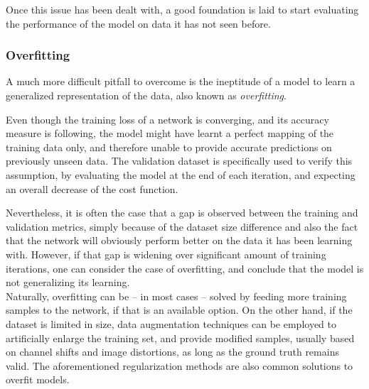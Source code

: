 Once this issue has been dealt with, a good foundation is laid to start
evaluating the performance of the model on data it has not seen before.

	\subsubsection{Overfitting}

A much more difficult pitfall to overcome is the ineptitude of a model to learn
a generalized representation of the data, also known as \emph{overfitting}.

Even though the training loss of a network is converging, and its accuracy
measure is following, the model might have learnt a perfect mapping of the
training data only, and therefore unable to provide accurate predictions on
previously unseen data. The validation dataset is specifically used to verify
this assumption, by evaluating the model at the end of each iteration, and
expecting an overall decrease of the cost function.

Nevertheless, it is often the case that a gap is observed between the training
and validation metrics, simply because of the dataset size difference and also
the fact that the network will obviously perform better on the data it has been
learning with. However, if that gap is widening over significant amount of
training iterations, one can consider the case of overfitting, and conclude
that the model is not generalizing its learning.\\

Naturally, overfitting can be -- in most cases -- solved by feeding more
training samples to the network, if that is an available option. On the other
hand, if the dataset is limited in size, data augmentation techniques can be
employed to artificially enlarge the training set, and provide modified
samples, usually based on channel shifts and image distortions, as long as the
ground truth remains valid. The aforementioned regularization methods are also
common solutions to overfit models.
